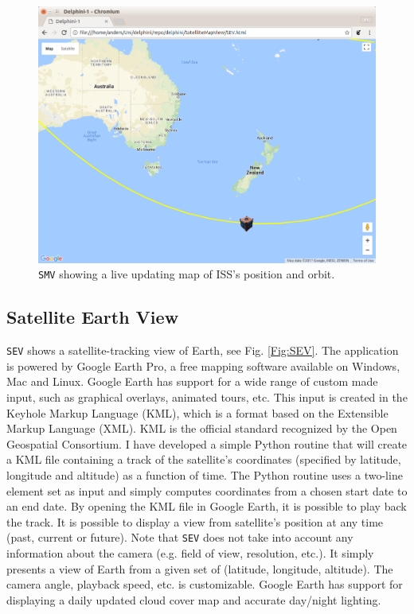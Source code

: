 \documentclass[10pt,a4paper]{article}
\begin{document}
\begin{figure}
\includegraphics[width=\textwidth]{../SMV.png}
\caption{\texttt{SMV} showing a live updating map of ISS's position and orbit.}
\label{Fig:SMV}
\end{figure}

\subsection{Satellite Earth View}
\texttt{SEV} shows a satellite-tracking view of Earth, see Fig. \ref{Fig:SEV}. The application is powered by Google Earth Pro, a free mapping software available on Windows, Mac and Linux. Google Earth has support for a wide range of custom made input, such as graphical overlays, animated tours, etc. This input is created in the Keyhole Markup Language (KML), which is a format based on the Extensible Markup Language (XML). KML is the official standard recognized by the Open Geospatial Consortium. I have developed a simple Python routine that will create a KML file containing a track of the satellite's coordinates (specified by latitude, longitude and altitude) as a function of time. The Python routine uses a two-line element set as input and simply computes coordinates from a chosen start date to an end date. By opening the KML file in Google Earth, it is possible to play back the track. It is possible to display a view from satellite's position at any time (past, current or future). Note that \texttt{SEV} does not take into account any information about the camera (e.g. field of view, resolution, etc.). It simply presents a view of Earth from a given set of (latitude, longitude, altitude). The camera angle, playback speed, etc. is customizable. Google Earth has support for displaying a daily updated cloud cover map and accurate day/night lighting.
\end{document}
